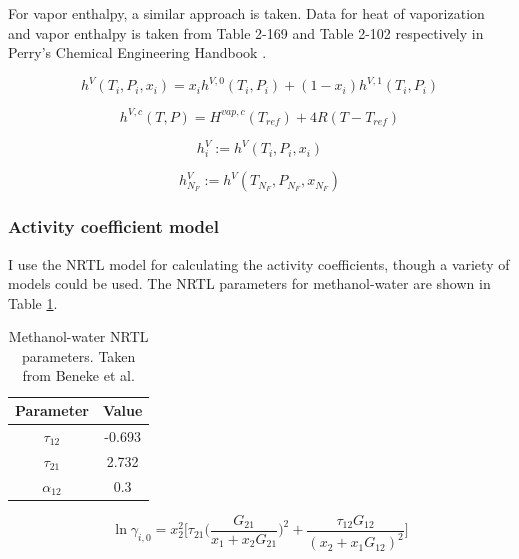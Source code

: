 For vapor enthalpy,  a similar approach is taken. Data for heat of vaporization and vapor enthalpy is taken from Table 2-169 and Table 2-102 respectively in Perry’s Chemical Engineering Handbook \cite{Perrys2018}.

\begin{equation}
    h^V(T_i, P_i, x_i) = x_i h^{V,0}(T_i,P_i) + (1-x_i) h^{V,1}(T_i,P_i)
\end{equation}


\begin{equation}
    h^{V,c}(T,P) = H^{vap, c}(T_{ref}) + 4R(T-T_{ref})
\end{equation}

\begin{equation}
    h^V_i := h^V(T_i, P_i,x_i)
\end{equation}

\begin{equation}
    h^V_{N_F} := h^V(T_{N_F}, P_{N_F},x_{N_F})
\end{equation}


\subsubsection{Activity coefficient model}

I use the NRTL model for calculating the activity coefficients, though a variety of models could be used. The NRTL parameters for methanol-water are shown in Table \ref{tab:nrtl_parameters}.

\begin{table}[]
    \centering
    \caption{Methanol-water NRTL parameters. Taken from Beneke et al.\cite{Beneke2012}}
    \begin{tabular}{cc}
        Parameter & Value \\
        \hline
         $\tau_{12}$ & -0.693  \\
         $\tau_{21}$ & 2.732   \\
         $\alpha_{12}$ & 0.3 \\
    \end{tabular}
    \label{tab:nrtl_parameters}
\end{table}

\begin{equation}
    \ln \gamma_{i,0} = x_2^2\biggl [\tau_{21} \biggl (\frac{G_{21}}{x_1+x_2G_{21}}\biggr)^2 + \frac{\tau_{12}G_{12}}{(x_2 + x_1 G_{12})^2} \biggr ]
\end{equation}

